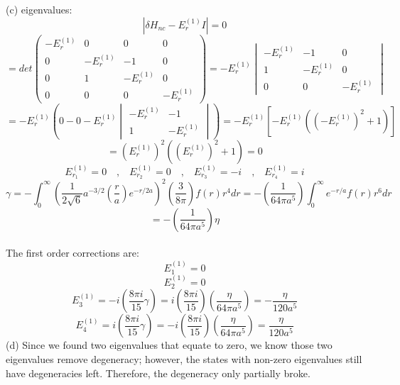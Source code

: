 \documentclass[11pt]{article}
\def\l{\ell}
\def\n{\eta}
\def\sp{\vspace{3mm}}
\newcommand{\Matrix}[1]{\begin{pmatrix} #1 \end{pmatrix}}
\theoremstyle{pink}
\theoremstyle{boxedsolution}
\theoremstyle{definition}
\theoremstyle{claim}
\begin{document}
(c) eigenvalues:
\[\left|\delta H_{nc}-E_r^{(1)}I\right|=0\]
\sp
\[=det\Matrix{
-E_r^{(1)} & 0 & 0 & 0\\
0 & -E_r^{(1)} & -1 & 0\\
0 & 1 & -E_r^{(1)} & 0\\
0 & 0 & 0 & -E_r^{(1)}}=-E_r^{(1)}\begin{vmatrix}
-E_r^{(1)} & -1 & 0\\
1 & -E_r^{(1)} & 0\\
0 & 0 & -E_r^{(1)}
\end{vmatrix}\]
\sp
\[=-E_r^{(1)}\left(0-0-E_r^{(1)}\begin{vmatrix}
-E_r^{(1)} & -1\\
1 & -E_r^{(1)}
\end{vmatrix}\right)=-E_r^{(1)}\left[-E_r^{(1)}\left(\left(-E_r^{(1)}\right)^2+1\right)\right]\]
\sp
\[=\left(E_r^{(1)}\right)^2\left(\left(E_r^{(1)}\right)^2+1\right)=0\]
\sp
\[E_{r_1}^{(1)} = 0 \text{ } \text{ , } \text{ } E_{r_2}^{(1)} = 0 \text{ } \text{ , } \text{ } E_{r_3}^{(1)} = -i \text{ } \text{ , } \text{ } E_{r_4}^{(1)} = i\]
\sp
\[\gamma = -\int^{\infty}_0 \left(\frac{1}{2\sqrt{6}}a^{-3/2}\left(\frac{r}{a}\right)e^{-r/2a}\right)^2
\left(\frac{3}{8\pi}\right)f(r)r^4dr=-\left(\frac{1}{64\pi a^5}\right)\int^\infty_0e^{-r/a}f(r)r^6dr\]
\sp
\[=-\left(\frac{1}{64\pi a^5}\right)\n\]
\sp
\\The first order corrections are:
\[E_1^{(1)} = 0\]
\sp
\[E_2^{(1)} = 0\]
\sp
\[E_3^{(1)} = -i\left(\frac{8\pi i}{15}\gamma\right)=i\left(\frac{8\pi i}{15}\right)\left(\frac{\n}{64\pi a^5}\right)=-\frac{\n}{120a^5}\]
\sp
\[E_4^{(1)} = i\left(\frac{8\pi i}{15}\gamma\right)=-i\left(\frac{8\pi i}{15}\right)\left(\frac{\n}{64\pi a^5}\right)=\frac{\n}{120a^5}\]
\newpage
(d) Since we found two eigenvalues that equate to zero, we know those two eigenvalues remove degeneracy; however, the states with non-zero eigenvalues still have degeneracies left. Therefore, the degeneracy only partially broke.
\begin{center}
\end{center}
\end{document}
